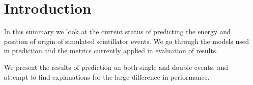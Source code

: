 \section{Introduction}
In this summary we look at the current status of predicting the energy and
position of origin of simulated scintillator events. We go through the models
used in prediction and the metrics currently applied in evaluation of results.

We present the results of prediction on both single and double events, and
attempt to find explanations for the large difference in performance.

